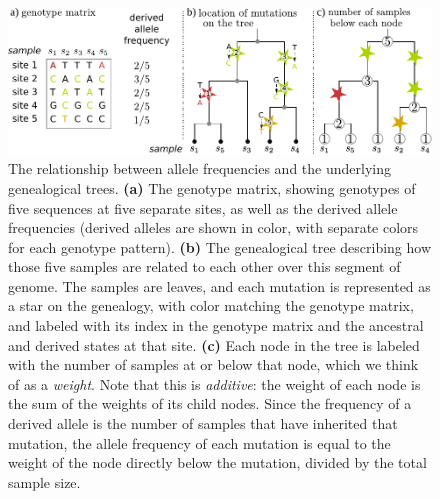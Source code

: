 \documentclass{article}
\begin{document}
\begin{figure}
    \begin{center}
        \includegraphics{figures/allele_frequency_diagram}
    \end{center}
    \caption{
        The relationship between allele frequencies and the underlying genealogical trees.
        \textbf{(a)} The genotype matrix, showing genotypes of five sequences at five separate sites,
        as well as the derived allele frequencies (derived alleles are shown in color,
        with separate colors for each genotype pattern).
        \textbf{(b)} The genealogical tree describing how those five samples are related to each other
        over this segment of genome. The samples are leaves,
        and each mutation is represented as a star on the genealogy,
        with color matching the genotype matrix, and
        labeled with its index in the genotype matrix
        and the ancestral and derived states at that site.
        \textbf{(c)} Each node in the tree is labeled with the number of samples
        at or below that node, which we think of as a \emph{weight}.
        Note that this is \emph{additive}:
        the weight of each node is the sum of the weights of its child nodes.
        Since the frequency of a derived allele is the number of samples
        that have inherited that mutation, the allele frequency of each mutation
        is equal to the weight of the node directly below the mutation,
        divided by the total sample size.
        \label{fig:allele_freqs}
    }
\end{figure}
\end{document}
